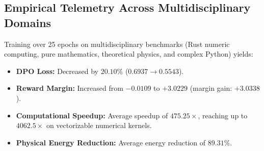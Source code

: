 \documentclass[10pt,journal,compsoc]{IEEEtran}
\theoremstyle{definition}
\begin{document}
\subsection{Empirical Telemetry Across Multidisciplinary Domains}
Training over 25 epochs on multidisciplinary benchmarks (Rust numeric computing, pure mathematics, theoretical physics, and complex Python) yields:
\begin{itemize}
    \item \textbf{DPO Loss:} Decreased by $\mathbf{20.10\%}$ ($0.6937 \to 0.5543$).
    \item \textbf{Reward Margin:} Increased from $-0.0109$ to $\mathbf{+3.0229}$ (margin gain: $+3.0338$).
    \item \textbf{Computational Speedup:} Average speedup of $\mathbf{475.25\times}$, reaching up to $\mathbf{4062.5\times}$ on vectorizable numerical kernels.
    \item \textbf{Physical Energy Reduction:} Average energy reduction of $\mathbf{89.31\%}$.
\end{itemize}
\end{document}
